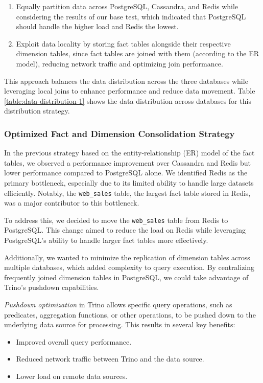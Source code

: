 \documentclass[conference]{IEEEtran}
\begin{document}
\begin{enumerate}
	\item Equally partition data across PostgreSQL, Cassandra, and Redis while considering the results
	      of our base test, which indicated that PostgreSQL should handle the higher load and Redis the lowest.
	\item Exploit data locality by storing fact tables alongside their respective dimension tables,
	      since fact tables are joined with them (according to the ER model), reducing network traffic and optimizing join performance.
\end{enumerate}

This approach balances the data distribution across the three databases while leveraging local joins
to enhance performance and reduce data movement. Table \ref{table:data-distribution-1} shows the data distribution across databases for this distribution strategy.\\

\subsubsection{Optimized Fact and Dimension Consolidation Strategy}

In the previous strategy based on the entity-relationship (ER) model of the fact tables, we observed a
performance improvement over Cassandra and Redis but lower performance compared to PostgreSQL alone.
We identified Redis as the primary bottleneck, especially due to its limited ability to handle large
datasets efficiently. Notably, the \texttt{web\_sales} table, the largest fact table stored in Redis,
was a major contributor to this bottleneck.

To address this, we decided to move the \texttt{web\_sales} table from Redis to PostgreSQL.
This change aimed to reduce the load on Redis while leveraging PostgreSQL's ability to handle larger
fact tables more effectively.

Additionally, we wanted to minimize the replication of dimension tables across multiple databases,
which added complexity to query execution. By centralizing frequently joined dimension tables in
PostgreSQL, we could take advantage of Trino’s pushdown capabilities.

\textit{Pushdown optimization} \cite{b13} in Trino allows specific query operations, such as predicates, aggregation
functions, or other operations, to be pushed down to the underlying data source for processing.
This results in several key benefits:
\begin{itemize}
	\item Improved overall query performance.
	\item Reduced network traffic between Trino and the data source.
	\item Lower load on remote data sources.
\end{itemize}
\end{document}
